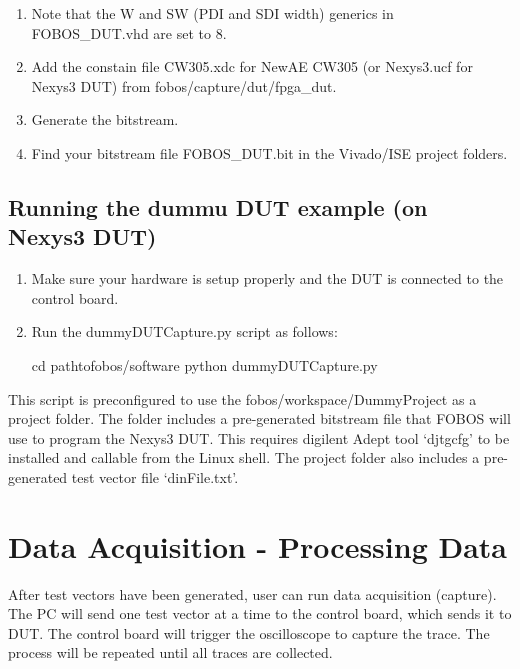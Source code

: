 \documentclass[letterpaper,10pt,english]{sphinxmanual}
\begin{document}
\begin{enumerate}
%
\setcounter{enumi}{2}
\item {} 
Note that the W and SW (PDI and SDI width) generics in FOBOS\_DUT.vhd are set to 8.

\item {} 
Add the constain file CW305.xdc for NewAE CW305 (or Nexys3.ucf for Nexys3 DUT) from fobos/capture/dut/fpga\_dut.

\item {} 
Generate the bitstream.

\item {} 
Find your bitstream file FOBOS\_DUT.bit in the Vivado/ISE project folders.

\end{enumerate}


\section{Running the dummu DUT example (on Nexys3 DUT)}
\label{\detokenize{dutdev:running-the-dummu-dut-example-on-nexys3-dut}}\begin{enumerate}
%
\item {} 
Make sure your hardware is setup properly and the DUT is connected to the control board.

\item {} 
Run the dummyDUTCapture.py script as follows:

\begin{sphinxVerbatim}[commandchars=\\\{\}]
\PYGZdl{} cd path\PYGZhy{}to\PYGZhy{}fobos/software
\PYGZdl{} python dummyDUTCapture.py
\end{sphinxVerbatim}

\end{enumerate}

This script is preconfigured to use the fobos/workspace/DummyProject as a project folder.
The folder includes a pre-generated bitstream file that FOBOS will use to program the Nexys3 DUT.
This requires digilent Adept tool ‘djtgcfg’ to be installed and callable from the Linux shell.
The project folder also includes a pre-generated test vector file ‘dinFile.txt’.


\chapter{Data Acquisition - Processing Data}
\label{\detokenize{capture_data:data-acquisition-processing-data}}\label{\detokenize{capture_data::doc}}
After test vectors have been generated, user can run data acquisition (capture). The PC will send one test vector at a time to the control board, which sends it to DUT. The control board will trigger the oscilloscope to capture the trace. The process will be repeated until all traces are collected.
\end{document}
